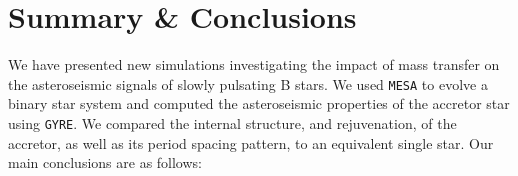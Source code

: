 \documentclass[desactivate]{aa}
\begin{document}


\section{Summary \& Conclusions} \label{sec:conclusion}

We have presented new simulations investigating the impact of mass transfer on the asteroseismic signals of slowly pulsating B stars. We used \texttt{MESA} to evolve a binary star system and computed the asteroseismic properties of the accretor star using \texttt{GYRE}. We compared the internal structure, and rejuvenation, of the accretor, as well as its period spacing pattern, to an equivalent single star. Our main conclusions are as follows:
\end{document}
